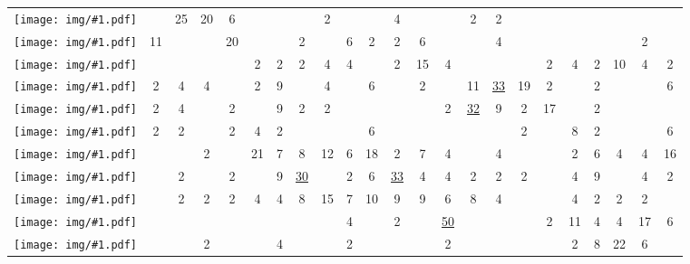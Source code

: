 \documentclass{aes130}
\newcommand{\sixthpic}[1][]{\texttt{[image: img/\#1.pdf]}}
\begin{document}
\begin{table*}
\begin{center}
\begin{tabular}{|c|c|c|c|c|c|c|c|c|c|c|c|c|c|c|c|c|c|c|c|c|c|c|}
\sixthpic[down-left]
 &    & 25 & 20 &  6 &    &    &    &  2 &    &    &  4 &    &    &  2 &  2 &    &    &    &    &    &    &    \\ \cline{2-23}

\sixthpic[down-right]
 & 11 &    &    & 20 &    &    &  2 &    &  6 &  2 &  2 &  6 &    &    &  4 &    &    &    &    &    &  2 &    \\ \cline{2-23}

\sixthpic[down-up]
 &    &    &    &    &  2 &  2 &  2 &  4 &  4 &    &  2 & 15 &  4 &    &    &    &  2 &  4 &  2 & 10 &  4 &  2 \\ \cline{2-23}

\sixthpic[rotate-clockwise]
 &  2 &  4 &  4 &    &  2 &  9 &    &  4 &    &  6 &    &  2 &    & 11 & \underline{33} & 19 &  2 &    &  2 &    &    &  6 \\ \cline{2-23}

\sixthpic[rotate-counterclockwise]
 &  2 &  4 &    &  2 &    &  9 &  2 &  2 &    &    &    &    &  2 & \underline{32} &  9 &  2 & 17 &    &  2 &    &    &    \\ \cline{2-23}

\sixthpic[digits]
 &  2 &  2 &    &  2 &  4 &  2 &    &    &    &  6 &    &    &    &    &    &  2 &    &  8 &  2 &    &    &  6 \\ \cline{2-23}

\sixthpic[letters]
 &    &    &  2 &    & 21 &  7 &  8 & 12 &  6 & 18 &  2 &  7 &  4 &    &  4 &    &    &  2 &  6 &  4 &  4 & 16 \\ \cline{2-23}

\sixthpic[sign-x]
 &    &  2 &    &  2 &    &  9 & \underline{30} &    &  2 &  6 & \underline{ 33} &  4 &  4 &  2 &  2 &  2 &    &  4 &  9 &    &  4 &  2 \\ \cline{2-23}

\sixthpic[sign-+]
 &    &  2 &  2 &  2 &  4 &  4 &  8 & 15 &  7 & 10 &  9 &  9 &  6 &  8 &  4 &    &    &  4 &  2 &  2 &  2 &    \\ \cline{2-23}

\sixthpic[multi-pinch-horizontal]
 &    &    &    &    &    &    &    &    &  4 &    &  2 &    & \underline{50} &    &    &    &  2 & 11 &  4 &  4 & 17 &  6 \\ \cline{2-23}

\sixthpic[multi-pinch-vertical]
 &    &    &  2 &    &    &  4 &    &    &  2 &    &    &    &  2 &    &    &    &    &  2 &  8 & 22 &  6 &    \\ \cline{2-23}


\end{tabular}
\end{center}
\end{table*}
\end{document}
